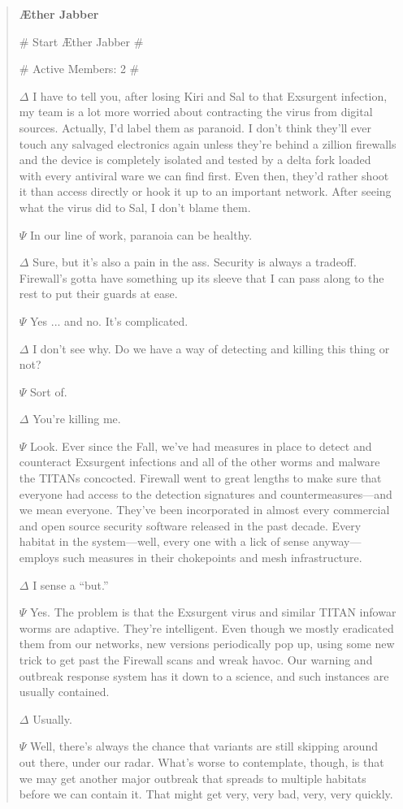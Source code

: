 \begin{quotation} \textbf{Æther Jabber} 

\# Start Æther Jabber \# 

\# Active Members: 2 \# 

$\Delta$ I have to tell you, after losing Kiri and Sal to that Exsurgent infection, my team is a lot more worried about contracting the virus from digital sources. Actually, I’d label them as paranoid. I don’t think they’ll ever touch any salvaged electronics again unless they’re behind a zillion firewalls and the device is completely isolated and tested by a delta fork loaded with every antiviral ware we can find first. Even then, they’d rather shoot it than access directly or hook it up to an important network. After seeing what the virus did to Sal, I don’t blame them. 

$\Psi$ In our line of work, paranoia can be healthy. 

$\Delta$ Sure, but it’s also a pain in the ass. Security is always a tradeoff. Firewall’s gotta have something up its sleeve that I can pass along to the rest to put their guards at ease. 

$\Psi$ Yes ... and no. It’s complicated. 

$\Delta$ I don’t see why. Do we have a way of detecting and killing this thing or not? 

$\Psi$ Sort of. 

$\Delta$ You’re killing me. 

$\Psi$ Look. Ever since the Fall, we’ve had measures in place to detect and counteract Exsurgent infections and all of the other worms and malware the TITANs concocted. Firewall went to great lengths to make sure that everyone had access to the detection signatures and countermeasures—and we mean everyone. They’ve been incorporated in almost every commercial and open source security software released in the past decade. Every habitat in the system—well, every one with a lick of sense anyway—employs such measures in their chokepoints and mesh infrastructure. 

$\Delta$ I sense a “but.” 

$\Psi$ Yes. The problem is that the Exsurgent virus and similar TITAN infowar worms are adaptive. They’re intelligent. Even though we mostly eradicated them from our networks, new versions periodically pop up, using some new trick to get past the Firewall scans and wreak havoc. Our warning and outbreak response system has it down to a science, and such instances are usually contained. 

$\Delta$ Usually. 

$\Psi$ Well, there’s always the chance that variants are still skipping around out there, under our radar. What’s worse to contemplate, though, is that we may get another major outbreak that spreads to multiple habitats before we can contain it. That might get very, very bad, very, very quickly. \end{quotation} 



